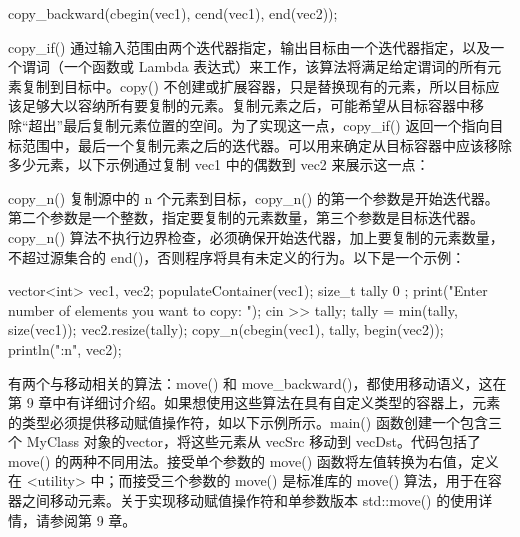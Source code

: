 \begin{cpp}
copy_backward(cbegin(vec1), cend(vec1), end(vec2));
\end{cpp}

copy\_if() 通过输入范围由两个迭代器指定，输出目标由一个迭代器指定，以及一个谓词（一个函数或 Lambda 表达式）来工作，该算法将满足给定谓词的所有元素复制到目标中。copy() 不创建或扩展容器，只是替换现有的元素，所以目标应该足够大以容纳所有要复制的元素。复制元素之后，可能希望从目标容器中移除“超出”最后复制元素位置的空间。为了实现这一点，copy\_if() 返回一个指向目标范围中，最后一个复制元素之后的迭代器。可以用来确定从目标容器中应该移除多少元素，以下示例通过复制 vec1 中的偶数到 vec2 来展示这一点：


copy\_n() 复制源中的 n 个元素到目标，copy\_n() 的第一个参数是开始迭代器。第二个参数是一个整数，指定要复制的元素数量，第三个参数是目标迭代器。copy\_n() 算法不执行边界检查，必须确保开始迭代器，加上要复制的元素数量，不超过源集合的 end()，否则程序将具有未定义的行为。以下是一个示例：

\begin{cpp}
vector<int> vec1, vec2;
populateContainer(vec1);
size_t tally { 0 };
print("Enter number of elements you want to copy: ");
cin >> tally;
tally = min(tally, size(vec1));
vec2.resize(tally);
copy_n(cbegin(vec1), tally, begin(vec2));
println("{:n}", vec2);
\end{cpp}


有两个与移动相关的算法：move() 和 move\_backward()，都使用移动语义，这在第 9 章中有详细讨介绍。如果想使用这些算法在具有自定义类型的容器上，元素的类型必须提供移动赋值操作符，如以下示例所示。main() 函数创建一个包含三个 MyClass 对象的vector，将这些元素从 vecSrc 移动到 vecDst。代码包括了 move() 的两种不同用法。接受单个参数的 move() 函数将左值转换为右值，定义在 <utility> 中；而接受三个参数的 move() 是标准库的 move() 算法，用于在容器之间移动元素。关于实现移动赋值操作符和单参数版本 std::move() 的使用详情，请参阅第 9 章。

